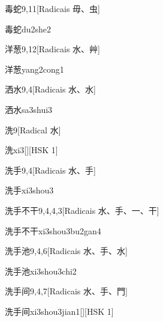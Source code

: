 \begin{entry}{毒蛇}{9,11}[Radicais ⽏、⾍]
  \begin{phonetics}{毒蛇}{du2she2}
  \end{phonetics}
\end{entry}

\begin{entry}{洋葱}{9,12}[Radicais ⽔、⾋]
  \begin{phonetics}{洋葱}{yang2cong1}
  \end{phonetics}
\end{entry}

\begin{entry}{洒水}{9,4}[Radicais ⽔、⽔]
  \begin{phonetics}{洒水}{sa3shui3}
  \end{phonetics}
\end{entry}

\begin{entry}{洗}{9}[Radical ⽔]
  \begin{phonetics}{洗}{xi3}[][HSK 1]
  \end{phonetics}
\end{entry}

\begin{entry}{洗手}{9,4}[Radicais ⽔、⼿]
  \begin{phonetics}{洗手}{xi3shou3}
  \end{phonetics}
\end{entry}

\begin{entry}{洗手不干}{9,4,4,3}[Radicais ⽔、⼿、⼀、⼲]
  \begin{phonetics}{洗手不干}{xi3shou3bu2gan4}
  \end{phonetics}
\end{entry}

\begin{entry}{洗手池}{9,4,6}[Radicais ⽔、⼿、⽔]
  \begin{phonetics}{洗手池}{xi3shou3chi2}
  \end{phonetics}
\end{entry}

\begin{entry}{洗手间}{9,4,7}[Radicais ⽔、⼿、⾨]
  \begin{phonetics}{洗手间}{xi3shou3jian1}[][HSK 1]
  \end{phonetics}
\end{entry}

